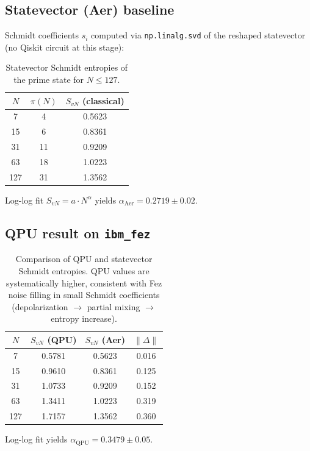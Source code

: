 \documentclass[11pt,a4paper]{article}
\begin{document}
\subsection{Statevector (Aer) baseline}

Schmidt coefficients $s_i$ computed via \texttt{np.linalg.svd} of the reshaped statevector (no Qiskit circuit at this stage):

\begin{table}[h]
\centering
\begin{tabular}{ccc}
\toprule
$N$ & $\pi(N)$ & $S_{vN}$ (classical) \\
\midrule
7   & 4  & 0.5623 \\
15  & 6  & 0.8361 \\
31  & 11 & 0.9209 \\
63  & 18 & 1.0223 \\
127 & 31 & 1.3562 \\
\bottomrule
\end{tabular}
\caption{Statevector Schmidt entropies of the prime state for $N \le 127$.}
\end{table}

Log-log fit $S_{vN} = a \cdot N^\alpha$ yields $\alpha_{\text{Aer}} = 0.2719 \pm 0.02$.

\subsection{QPU result on \texttt{ibm\_fez}}

\begin{table}[h]
\centering
\begin{tabular}{cccc}
\toprule
$N$ & $S_{vN}$ (QPU) & $S_{vN}$ (Aer) & $\|\Delta\|$ \\
\midrule
7   & 0.5781 & 0.5623 & 0.016 \\
15  & 0.9610 & 0.8361 & 0.125 \\
31  & 1.0733 & 0.9209 & 0.152 \\
63  & 1.3411 & 1.0223 & 0.319 \\
127 & 1.7157 & 1.3562 & 0.360 \\
\bottomrule
\end{tabular}
\caption{Comparison of QPU and statevector Schmidt entropies. QPU values are systematically higher, consistent with Fez noise filling in small Schmidt coefficients (depolarization $\to$ partial mixing $\to$ entropy increase).}
\end{table}

Log-log fit yields $\alpha_{\text{QPU}} = 0.3479 \pm 0.05$.
\end{document}
